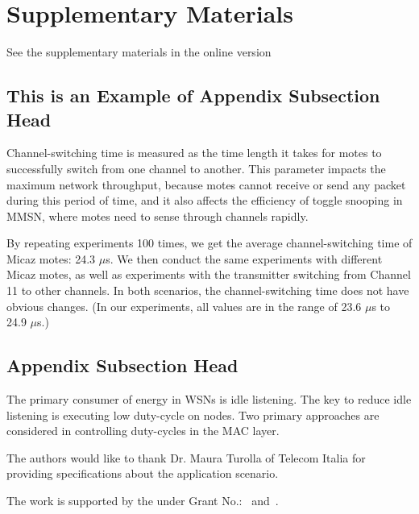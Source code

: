 \documentclass[acmtog, authorversion]{acmart}
\begin{document}
\section{Supplementary Materials}


\begin{printonly}
  See the supplementary materials in the online version
\end{printonly}

\begin{screenonly}
\subsection{This is an Example of Appendix Subsection Head}

Channel-switching time is measured as the time length it takes for
motes to successfully switch from one channel to another. This
parameter impacts the maximum network throughput, because motes
cannot receive or send any packet during this period of time, and it
also affects the efficiency of toggle snooping in MMSN, where motes
need to sense through channels rapidly.

By repeating experiments 100 times, we get the average
channel-switching time of Micaz motes: 24.3 $\mu$s. We then conduct
the same experiments with different Micaz motes, as well as
experiments with the transmitter switching from Channel 11 to other
channels. In both scenarios, the channel-switching time does not have
obvious changes. (In our experiments, all values are in the range of
23.6 $\mu$s to 24.9 $\mu$s.)

\subsection{Appendix Subsection Head}

The primary consumer of energy in WSNs is idle listening. The key to
reduce idle listening is executing low duty-cycle on nodes. Two
primary approaches are considered in controlling duty-cycles in the
MAC layer.

\end{screenonly}

\begin{acks}

The authors would like to thank Dr. Maura Turolla of Telecom
Italia for providing specifications about the application scenario.

The work is supported by the  under Grant
No.:~
and~.


\end{acks}
\end{document}
